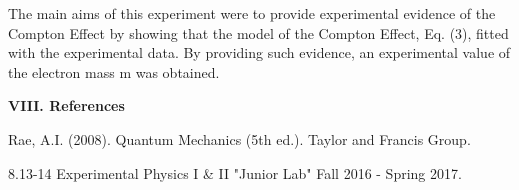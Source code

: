 \documentclass[fleqn]{article}
\begin{document}
  The main aims of this experiment were to provide experimental evidence of the Compton Effect by showing that the model of the Compton Effect,
  Eq. (3), fitted with the experimental data. By providing such evidence, an experimental value of the electron mass m was obtained.

  \vspace{15px}

  \textbf{VIII. References}

  \vspace{15px}

  Rae, A.I. (2008). Quantum Mechanics (5th ed.). Taylor and Francis Group.

  \vspace{5px}

  8.13-14 Experimental Physics I \& II "Junior Lab" Fall 2016 - Spring 2017.
\end{document}
